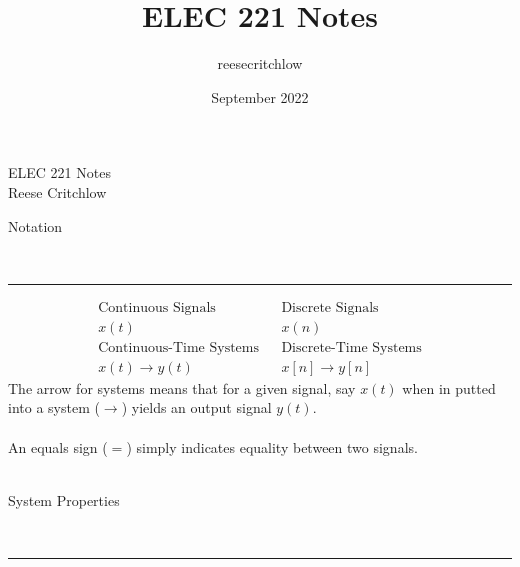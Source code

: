 \documentclass{article}
\title{ELEC 221 Notes}
\author{reesecritchlow }
\date{September 2022}
\newcommand{\header}[1]{\begin{large}\noindent #1\end{large}\\\rule{\textwidth}{0.5pt}}
\newcommand{\gap}{\medskip\\}
\begin{document}
\begin{center}
    \Large ELEC 221 Notes\\
    \normalsize Reese Critchlow
\end{center}

\header{Notation}

\begin{align*}
    \textrm{Continuous Signals} && \textrm{Discrete Signals}\\
    x(t) && x(n)\\
    \textrm{Continuous-Time Systems} && \textrm{Discrete-Time Systems}\\
    x(t) \to y(t) && x[n] \to y[n]
\end{align*}
The arrow for systems means that for a given signal, say $x(t)$ when in putted into a system ($\to$) yields an output signal $y(t)$.
\\\gap
An equals sign ($=$) simply indicates equality between two signals.
\\\gap
\header{System Properties}
\end{document}
